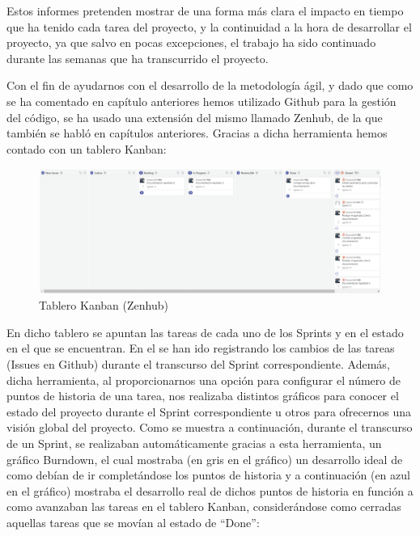\documentclass[11pt,openany]{book}
\begin{document}
Estos informes pretenden mostrar de una forma más clara el impacto en tiempo que ha tenido cada tarea del proyecto, y la continuidad a la hora de desarrollar el proyecto, ya que salvo en pocas excepciones, el trabajo ha sido continuado durante las semanas que ha transcurrido el proyecto.

Con el fin de ayudarnos con el desarrollo de la metodología ágil, y dado que como se ha comentado en capítulo anteriores hemos utilizado Github para la gestión del código, se ha usado una extensión del mismo llamado Zenhub, de la que también se habló en capítulos anteriores. Gracias a dicha herramienta hemos contado con un tablero Kanban:

\begin{figure}[H]
\centering
\includegraphics[totalheight=5cm]{kanban.png}
\caption{Tablero Kanban (Zenhub)}
\end{figure}
\par\bigskip 
\noindent

En dicho tablero se apuntan las tareas de cada uno de los Sprints y en el estado en el que se encuentran. En el se han ido registrando los cambios de las tareas (Issues en Github) durante el transcurso del Sprint correspondiente. Además, dicha herramienta, al proporcionarnos una opción para configurar el número de puntos de historia de una tarea, nos realizaba distintos gráficos para conocer el estado del proyecto durante el Sprint correspondiente u otros para ofrecernos una visión global del proyecto. Como se muestra a continuación, durante el transcurso de un Sprint, se realizaban automáticamente gracias a esta herramienta, un gráfico Burndown, el cual mostraba (en gris en el gráfico) un desarrollo ideal de como debían de ir completándose los puntos de historia y a continuación (en azul en el gráfico) mostraba el desarrollo real de dichos puntos de historia en función a como avanzaban las tareas en el tablero Kanban, considerándose como cerradas aquellas tareas que se movían al estado de ``Done'': 
\end{document}
